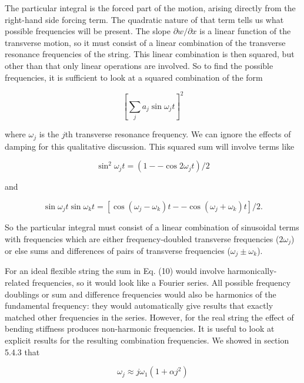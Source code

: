   The particular integral is the forced part of the motion, arising directly 
  from the right-hand side forcing term. The quadratic nature of that term 
  tells us what possible frequencies will be present. The slope $\partial 
  w/\partial x$ is a linear function of the transverse motion, so it must 
  consist of a linear combination of the transverse resonance frequencies of 
  the string. This linear combination is then squared, but other than that only 
  linear operations are involved. So to find the possible frequencies, it is 
  sufficient to look at a squared combination of the form 

  \begin{equation*}\left[\sum_j{a_j \sin \omega_j t} \right]^2 
  \tag{10}\end{equation*} 

  \noindent{}where $\omega_j$ is the $j$th transverse resonance frequency. We 
  can ignore the effects of damping for this qualitative discussion. This 
  squared sum will involve terms like 

  \begin{equation*}\sin^2 \omega_j t = (1 -- \cos 2 \omega_j t)/2 
  \tag{11}\end{equation*} 

  \noindent{}and 

  \begin{equation*}\sin \omega_j t \sin \omega_k t = [\cos (\omega_j 
  -\omega_k)t -- \cos (\omega_j +\omega_k)t]/2 . \tag{12}\end{equation*} 

  So the particular integral must consist of a linear combination of sinusoidal 
  terms with frequencies which are either frequency-doubled transverse 
  frequencies ($2 \omega_j$) or else sums and differences of pairs of 
  transverse frequencies ($\omega_j \pm \omega_k$). 

  For an ideal flexible string the sum in Eq. (10) would involve 
  harmonically-related frequencies, so it would look like a Fourier series. All 
  possible frequency doublings or sum and difference frequencies would also be 
  harmonics of the fundamental frequency: they would automatically give results 
  that exactly matched other frequencies in the series. However, for the real 
  string the effect of bending stiffness produces non-harmonic frequencies. It 
  is useful to look at explicit results for the resulting combination 
  frequencies. We showed in section 5.4.3 that 

  \begin{equation*}\omega_j \approx j \omega_1 (1+\alpha j^2) 
  \tag{13}\end{equation*} 

